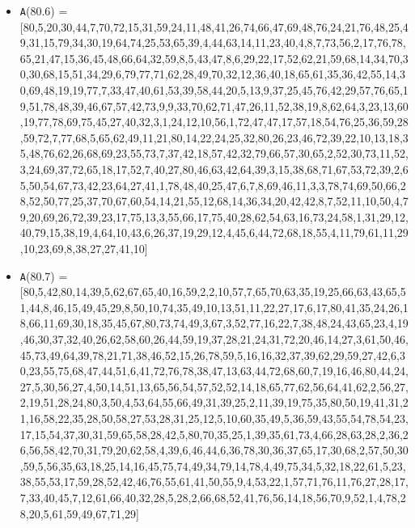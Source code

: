 \documentclass[runningheads,a4paper]{llncs}
\begin{document}
\begin{itemize}
	\item {\texttt A(80.6) = } [80,5,20,30,44,7,70,72,15,31,59,24,11,48,41,26,74,66,47,69,48,76,24,21,76,48,25,49,31,15,79,34,30,19,64,74,25,53,65,39,4,44,63,14,11,23,40,4,8,7,73,56,2,17,76,78,65,21,47,15,36,45,48,66,64,32,59,8,5,43,47,8,6,29,22,17,52,62,21,59,68,14,34,70,30,30,68,15,51,34,29,6,79,77,71,62,28,49,70,32,12,36,40,18,65,61,35,36,42,55,14,30,69,48,19,19,77,7,33,47,40,61,53,39,58,44,20,5,13,9,37,25,45,76,42,29,57,76,65,19,51,78,48,39,46,67,57,42,73,9,9,33,70,62,71,47,26,11,52,38,19,8,62,64,3,23,13,60,19,77,78,69,75,45,27,40,32,3,1,24,12,10,56,1,72,47,47,17,57,18,54,76,25,36,59,28,59,72,7,77,68,5,65,62,49,11,21,80,14,22,24,25,32,80,26,23,46,72,39,22,10,13,18,35,48,76,62,26,68,69,23,55,73,7,37,42,18,57,42,32,79,66,57,30,65,2,52,30,73,11,52,3,24,69,37,72,65,18,17,52,7,40,27,80,46,63,42,64,39,3,15,38,68,71,67,53,72,39,2,65,50,54,67,73,42,23,64,27,41,1,78,48,40,25,47,6,7,8,69,46,11,3,3,78,74,69,50,66,28,52,50,77,25,37,70,67,60,54,14,21,55,12,68,14,36,34,20,42,42,8,7,52,11,10,50,4,79,20,69,26,72,39,23,17,75,13,3,55,66,17,75,40,28,62,54,63,16,73,24,58,1,31,29,12,40,79,15,38,19,4,64,10,43,6,26,37,19,29,12,4,45,6,44,72,68,18,55,4,11,79,61,11,29,10,23,69,8,38,27,27,41,10]
	\item {\texttt A(80.7) = } [80,5,42,80,14,39,5,62,67,65,40,16,59,2,2,10,57,7,65,70,63,35,19,25,66,63,43,65,51,44,8,46,15,49,45,29,8,50,10,74,35,49,10,13,51,11,22,27,17,6,17,80,41,35,24,26,18,66,11,69,30,18,35,45,67,80,73,74,49,3,67,3,52,77,16,22,7,38,48,24,43,65,23,4,19,46,30,37,32,40,26,62,58,60,26,44,59,19,37,28,21,24,31,72,20,46,14,27,3,61,50,46,45,73,49,64,39,78,21,71,38,46,52,15,26,78,59,5,16,16,32,37,39,62,29,59,27,42,6,30,23,55,75,68,47,44,51,6,41,72,76,78,38,47,13,63,44,72,68,60,7,19,16,46,80,44,24,27,5,30,56,27,4,50,14,51,13,65,56,54,57,52,52,14,18,65,77,62,56,64,41,62,2,56,27,2,19,51,28,24,80,3,50,4,53,64,55,66,49,31,39,25,2,11,39,19,75,35,80,50,19,41,31,21,16,58,22,35,28,50,58,27,53,28,31,25,12,5,10,60,35,49,5,36,59,43,55,54,78,54,23,17,15,54,37,30,31,59,65,58,28,42,5,80,70,35,25,1,39,35,61,73,4,66,28,63,28,2,36,26,56,58,42,70,31,79,20,62,58,4,39,6,46,44,6,36,78,30,36,37,65,17,30,68,2,57,50,30,59,5,56,35,63,18,25,14,16,45,75,74,49,34,79,14,78,4,49,75,34,5,32,18,22,61,5,23,38,55,53,17,59,28,52,42,46,76,55,61,41,50,55,9,4,53,22,1,57,71,76,11,76,27,28,17,7,33,40,45,7,12,61,66,40,32,28,5,28,2,66,68,52,41,76,56,14,18,56,70,9,52,1,4,78,28,20,5,61,59,49,67,71,29]

\end{itemize}
\end{document}
